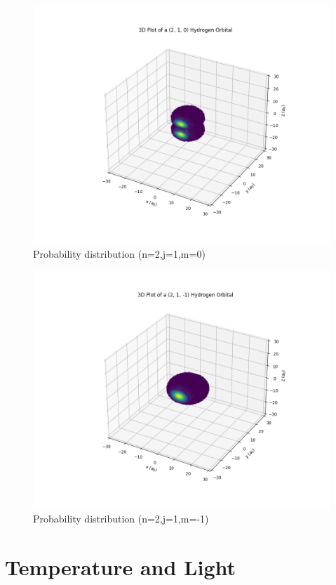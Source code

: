 \begin{figure}
  \centering
  \includegraphics{images9/3d_plot_2,1,0.png}
  \caption{Probability distribution (n=2,j=1,m=0)}
\end{figure}

\begin{figure}
  \centering
  \includegraphics{images9/3d_plot_2,1,-1.png}
  \caption{Probability distribution (n=2,j=1,m=-1)}
\end{figure}


\section{Temperature and Light}

